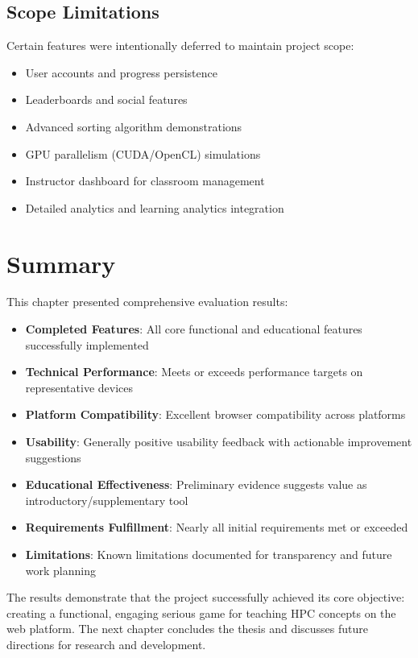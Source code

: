 \subsection{Scope Limitations}
\label{subsec:scope-limitations}

Certain features were intentionally deferred to maintain project scope:

\begin{itemize}
    \item User accounts and progress persistence
    \item Leaderboards and social features
    \item Advanced sorting algorithm demonstrations
    \item GPU parallelism (CUDA/OpenCL) simulations
    \item Instructor dashboard for classroom management
    \item Detailed analytics and learning analytics integration
\end{itemize}

\section{Summary}
\label{sec:results-summary}

This chapter presented comprehensive evaluation results:

\begin{itemize}
    \item \textbf{Completed Features}: All core functional and educational features successfully implemented
    \item \textbf{Technical Performance}: Meets or exceeds performance targets on representative devices
    \item \textbf{Platform Compatibility}: Excellent browser compatibility across platforms
    \item \textbf{Usability}: Generally positive usability feedback with actionable improvement suggestions
    \item \textbf{Educational Effectiveness}: Preliminary evidence suggests value as introductory/supplementary tool
    \item \textbf{Requirements Fulfillment}: Nearly all initial requirements met or exceeded
    \item \textbf{Limitations}: Known limitations documented for transparency and future work planning
\end{itemize}

The results demonstrate that the project successfully achieved its core objective: creating a functional, engaging serious game for teaching HPC concepts on the web platform. The next chapter concludes the thesis and discusses future directions for research and development.
